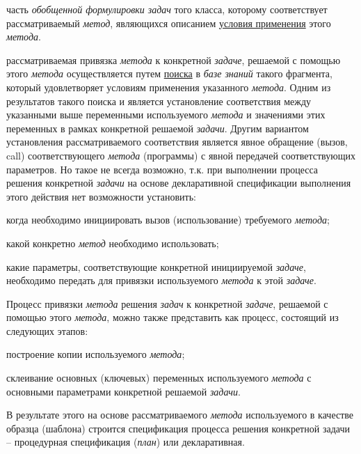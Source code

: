 \begin{SCn}
\begin{scnsubstruct}
{\begin{scnitemize}
                \item часть \textit{обобщенной формулировки задач} того класса, которому соответствует рассматриваемый \textit{метод}, являющихся описанием \uline{условия применения} этого \textit{метода}.
            \end{scnitemize}
             рассматриваемая привязка \textit{метода} к конкретной \textit{задаче}, решаемой с помощью этого \textit{метода} осуществляется путем \uline{поиска} в \textit{базе знаний} такого фрагмента, который удовлетворяет условиям применения указанного \textit{метода}. Одним из результатов такого поиска и является установление соответствия между указанными выше переменными используемого \textit{метода} и значениями этих переменных в рамках конкретной решаемой \textit{задачи}. Другим вариантом установления рассматриваемого соответствия является явное обращение (вызов, call) соответствующего \textit{метода} (программы) с явной передачей соответствующих параметров. Но такое не всегда возможно, т.к. при выполнении процесса решения конкретной \textit{задачи} на основе декларативной спецификации выполнения этого действия нет возможности установить:
            \begin{scnitemize}
                \item когда необходимо инициировать вызов (использование) требуемого \textit{метода};
                \item какой конкретно \textit{метод} необходимо использовать;
                \item какие параметры, соответствующие конкретной инициируемой \textit{задаче}, необходимо передать для привязки используемого \textit{метода} к этой \textit{задаче}.
            \end{scnitemize}
            Процесс привязки \textit{метода} решения \textit{задач} к конкретной \textit{задаче}, решаемой с помощью этого \textit{метода}, можно также представить как процесс, состоящий из следующих этапов:
            \begin{scnitemize}
                \item построение копии используемого \textit{метода};
                \item склеивание основных (ключевых) переменных используемого \textit{метода} с основными параметрами конкретной решаемой \textit{задачи}.
            \end{scnitemize}
            В результате этого на основе рассматриваемого \textit{метода} используемого в качестве образца (шаблона) строится спецификация процесса решения конкретной задачи -- процедурная спецификация (\textit{план}) или декларативная.}

\end{scnsubstruct}
\end{SCn}
